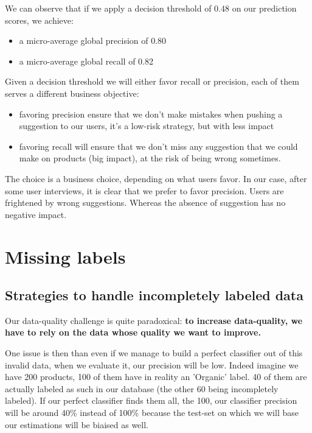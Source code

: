 We can observe that if we apply a decision threshold of 0.48 on our prediction scores, we achieve:
\begin{itemize}
	\item a micro-average global precision of 0.80
	\item a micro-average global recall of 0.82
\end{itemize}

Given a decision threshold we will either favor recall or precision, each of them serves a different business objective:
\begin{itemize}
	\item favoring precision ensure that we don't make mistakes when pushing a suggestion to our users, it's a low-risk strategy, but with less impact
	\item favoring recall will ensure that we don't miss any suggestion that we could make on products (big impact), at the risk of being wrong sometimes.
\end{itemize}

The choice is a business choice, depending on what users favor. In our case, after some user interviews, it is clear that we prefer to favor precision. Users are frightened by wrong suggestions. Whereas the absence of suggestion has no negative impact.

\section{Missing labels}

\subsection{Strategies to handle incompletely labeled data}

Our data-quality challenge is quite paradoxical: \textbf{to increase data-quality, we have to rely on the data whose quality we want to improve.}

One issue is then than even if we manage to build a perfect classifier out of this invalid data, when we evaluate it, our precision will be low. Indeed imagine we have 200 products, 100 of them have in reality an 'Organic' label. 40 of them are actually labeled as such in our database (the other 60 being incompletely labeled). If our perfect classifier finds them all, the 100, our classifier precision will be around 40\% instead of 100\% because the test-set on which we will base our estimations will be biaised as well.


